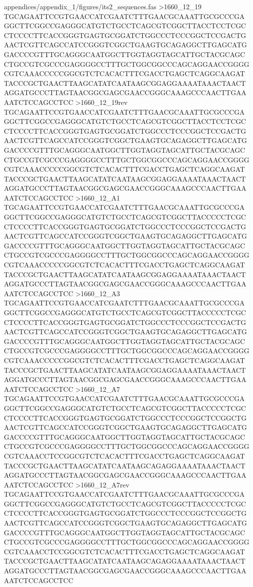 {\begin{filecontents*}{appendices/appendix_1/figures/its2_sequences.fas}
>1660_12_19
TGCAGAATTCCGTGAACCATCGAATCTTTGAACGCAAATTGCGCCCGAGGCTTCGGCCGAGGGCATGTCTGCCTCAGCGTCGGCTTACCTCCTCGCCTCCCCTTCACCGGGTGAGTGCGGATCTGGCCCTCCCGGCTCCGACTGAACTCGTTCAGCCATCCGGGTCGGCTGAAGTGCAGAGGCTTGAGCATGGACCCCGTTTGCAGGGCAATGGCTTGGTAGGTAGCATTGCTACGCAGCCTGCCGTCGCCCGAGGGGCCTTTGCTGGCGGCCCAGCAGGAACCGGGGCGTCAAACCCCCGGCGTCTCACACTTTCGACCTGAGCTCAGGCAAGATTACCCGCTGAACTTAAGCATATCAATAAGCGGAGGAAAATAAACTAACTAGGATGCCCTTAGTAACGGCGAGCGAACCGGGCAAAGCCCAACTTGAAAATCTCCAGCCTCC
>1660_12_19rev
TGCAGAATTCCGTGAACCATCGAATCTTTGAACGCAAATTGCGCCCGAGGCTTCGGCCGAGGGCATGTCTGCCTCAGCGTCGGCTTACCTCCTCGCCTCCCCTTCACCGGGTGAGTGCGGATCTGGCCCTCCCGGCTCCGACTGAACTCGTTCAGCCATCCGGGTCGGCTGAAGTGCAGAGGCTTGAGCATGGACCCCGTTTGCAGGGCAATGGCTTGGTAGGTAGCATTGCTACGCAGCCTGCCGTCGCCCGAGGGGCCTTTGCTGGCGGCCCAGCAGGAACCGGGGCGTCAAACCCCCGGCGTCTCACACTTTCGACCTGAGCTCAGGCAAGATTACCCGCTGAACTTAAGCATATCAATAAGCGGAGGAAAATAAACTAACTAGGATGCCCTTAGTAACGGCGAGCGAACCGGGCAAAGCCCAACTTGAAAATCTCCAGCCTCC
>1660_12_A1
TGCAGAATTCCGTGAACCATCGAATCTTTGAACGCAAATTGCGCCCGAGGCTTCGGCCGAGGGCATGTCTGCCTCAGCGTCGGCTTACCCCCTCGCCTCCCCTTCACCGGGTGAGTGCGGATCTGGCCCTCCCGGCTCCGACTGAACTCGTTCAGCCATCCGGGTCGGCTGAAGTGCAGAGGCTTGAGCATGGACCCCGTTTGCAGGGCAATGGCTTGGTAGGTAGCATTGCTACGCAGCCTGCCGTCGCCCGAGGGGCCTTTGCTGGCGGCCCAGCAGGAACCGGGGCGTCAAACCCCCGGCGTCTCACACTTTCGACCTGAGCTCAGGCAAGATTACCCGCTGAACTTAAGCATATCAATAAGCGGAGGAAAATAAACTAACTAGGATGCCCTTAGTAACGGCGAGCGAACCGGGCAAAGCCCAACTTGAAAATCTCCAGCCTCC
>1660_12_A3
TGCAGAATTCCGTGAACCATCGAATCTTTGAACGCAAATTGCGCCCGAGGCTTCGGCCGAGGGCATGTCTGCCTCAGCGTCGGCTTACCCCCTCGCCTCCCCTTCACCGGGTGAGTGCGGATCTGGCCCTCCCGGCTCCGACTGAACTCGTTCAGCCATCCGGGTCGGCTGAAGTGCAGAGGCTTGAGCATGGACCCCGTTTGCAGGGCAATGGCTTGGTAGGTAGCATTGCTACGCAGCCTGCCGTCGCCCGAGGGGCCTTTGCTGGCGGCCCAGCAGGAACCGGGGCGTCAAACCCCCGGCGTCTCACACTTTCGACCTGAGCTCAGGCAAGATTACCCGCTGAACTTAAGCATATCAATAAGCGGAGGAAAATAAACTAACTAGGATGCCCTTAGTAACGGCGAGCGAACCGGGCAAAGCCCAACTTGAAAATCTCCAGCCTCC
>1660_12_A7
TGCAGAATTCCGTGAACCATCGAATCTTTGAACGCAAATTGCGCCCGAGGCTTCGGCCGAGGGCATGTCTGCCTCAGCGTCGGCTTACCCCCTCGCCTCCCCTTCACCGGGTGAGTGCGGATCTGGCCCTCCCGGCTCCGGCTGAACTCGTTCAGCCATCCGGGTCGGCTGAAGTGCAGAGGCTTGAGCATGGACCCCGTTTGCAGGGCAATGGCTTGGTAGGTAGCATTGCTACGCAGCCTGCCGTCGCCCGAGGGGCCTTTGCTGGCGGCCCAGCAGGAACCGGGGCGTCAAACCTCCGGCGTCTCACACTTTCGACCTGAGCTCAGGCAAGATTACCCGCTGAACTTAAGCATATCAATAAGCAGAGGAAAATAAACTAACTAGGATGCCCTTAGTAACGGCGAGCGAACCGGGCAAAGCCCAACTTGAAAATCTCCAGCCTCC
>1660_12_A7rev
TGCAGAATTCCGTGAACCATCGAATCTTTGAACGCAAATTGCGCCCGAGGCTTCGGCCGAGGGCATGTCTGCCTCAGCGTCGGCTTACCCCCTCGCCTCCCCTTCACCGGGTGAGTGCGGATCTGGCCCTCCCGGCTCCGGCTGAACTCGTTCAGCCATCCGGGTCGGCTGAAGTGCAGAGGCTTGAGCATGGACCCCGTTTGCAGGGCAATGGCTTGGTAGGTAGCATTGCTACGCAGCCTGCCGTCGCCCGAGGGGCCTTTGCTGGCGGCCCAGCAGGAACCGGGGCGTCAAACCTCCGGCGTCTCACACTTTCGACCTGAGCTCAGGCAAGATTACCCGCTGAACTTAAGCATATCAATAAGCAGAGGAAAATAAACTAACTAGGATGCCCTTAGTAACGGCGAGCGAACCGGGCAAAGCCCAACTTGAAAATCTCCAGCCTCC

\end{filecontents*}}

